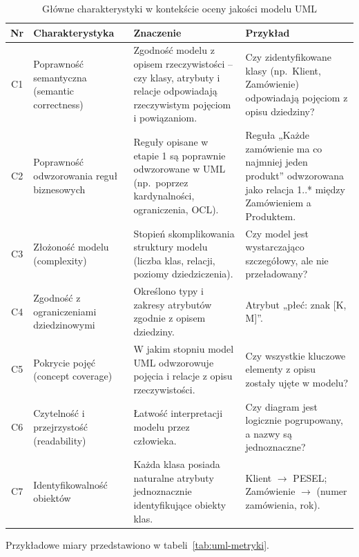 \begin{table}[!ht]
  \centering
  \caption{Główne charakterystyki w kontekście oceny jakości modelu UML}
  \label{tab:uml-char}
  \scriptsize
  \begin{tabularx}{\textwidth}{cLp{4cm}p{4cm}}
    \toprule
    \textbf{Nr} & \textbf{Charakterystyka} & \textbf{Znaczenie} & \textbf{Przykład} \\
    \midrule
    C1 &
    Poprawność semantyczna (semantic correctness) &
    Zgodność modelu z opisem rzeczywistości -- czy klasy, atrybuty i relacje odpowiadają rzeczywistym pojęciom i powiązaniom. &
    Czy zidentyfikowane klasy (np.\ Klient, Zamówienie) odpowiadają pojęciom z opisu dziedziny? \\
    C2 &
    Poprawność odwzorowania reguł biznesowych &
    Reguły opisane w etapie 1 są poprawnie odwzorowane w UML (np.\ poprzez kardynalności, ograniczenia, OCL). &
    Reguła „Każde zamówienie ma co najmniej jeden produkt” odwzorowana jako relacja 1..* między Zamówieniem a Produktem. \\
    C3 &
    Złożoność modelu (complexity) &
    Stopień skomplikowania struktury modelu (liczba klas, relacji, poziomy dziedziczenia). &
    Czy model jest wystarczająco szczegółowy, ale nie przeładowany? \\
    C4 &
    Zgodność z ograniczeniami dziedzinowymi &
    Określono typy i zakresy atrybutów zgodnie z opisem dziedziny. &
    Atrybut „płeć: znak [K, M]”. \\
    C5 &
    Pokrycie pojęć (concept coverage) &
    W jakim stopniu model UML odwzorowuje pojęcia i relacje z opisu rzeczywistości. &
    Czy wszystkie kluczowe elementy z opisu zostały ujęte w modelu? \\
    C6 &
    Czytelność i przejrzystość (readability) &
    Łatwość interpretacji modelu przez człowieka. &
    Czy diagram jest logicznie pogrupowany, a nazwy są jednoznaczne? \\
    C7 &
    Identyfikowalność obiektów &
    Każda klasa posiada naturalne atrybuty jednoznacznie identyfikujące obiekty klas. &
    Klient $\rightarrow$ PESEL; Zamówienie $\rightarrow$ (numer zamówienia, rok). \\
    \bottomrule
  \end{tabularx}
\end{table}



Przykładowe miary przedstawiono w tabeli~\ref{tab:uml-metryki}.


